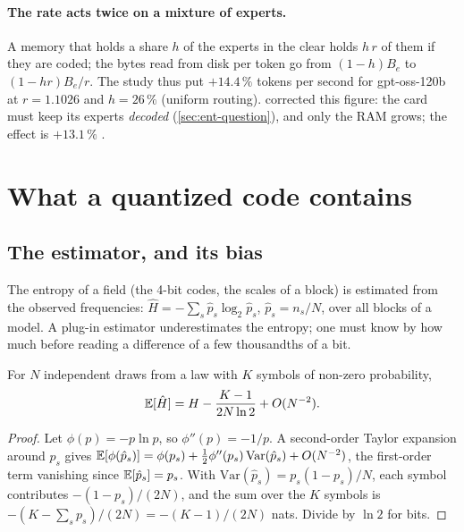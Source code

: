 \paragraph{The rate acts twice on a mixture of experts.} A memory that holds a share $h$ of the experts in the clear holds $h\,r$ of them if they are coded; the bytes read from disk per token go from $(1-h)B_e$ to $(1-hr)B_e/r$. The study thus put $+14.4\,\%$ tokens per second for gpt-oss-120b at $r = 1.1026$ and $h = 26\,\%$ (uniform routing).   corrected this figure: the card must keep its experts \emph{decoded} (\cref{sec:ent-question}), and only the RAM grows; the effect is $+13.1\,\%$ \calc.

\section{What a quantized code contains}\label{sec:ent-contenu}

\subsection{The estimator, and its bias}

The entropy of a field (the 4-bit codes, the scales of a block) is estimated from the observed frequencies: $\hat H = -\sum_s \hat p_s \log_2 \hat p_s$, $\hat p_s = n_s/N$, over all blocks of a model. A plug-in estimator underestimates the entropy; one must know by how much before reading a difference of a few thousandths of a bit.

\begin{lemme}\label{lem:biais-entropie}
For $N$ independent draws from a law with $K$ symbols of non-zero probability,
\begin{equation}\label{eq:biais}
\mathbb{E}[\hat H] = H - \frac{K - 1}{2N\ln 2} + O(N^{-2}).
\end{equation}
\end{lemme}

\begin{proof}
Let $\phi(p) = -p \ln p$, so $\phi''(p) = -1/p$. A second-order Taylor expansion around $p_s$ gives $\mathbb{E}[\phi(\hat p_s)] = \phi(p_s) + \tfrac12 \phi''(p_s)\,\mathrm{Var}(\hat p_s) + O(N^{-2})$, the first-order term vanishing since $\mathbb{E}[\hat p_s] = p_s$. With $\mathrm{Var}(\hat p_s) = p_s(1-p_s)/N$, each symbol contributes $-(1-p_s)/(2N)$, and the sum over the $K$ symbols is $-(K - \sum_s p_s)/(2N) = -(K-1)/(2N)$ nats. Divide by $\ln 2$ for bits.
\end{proof}

